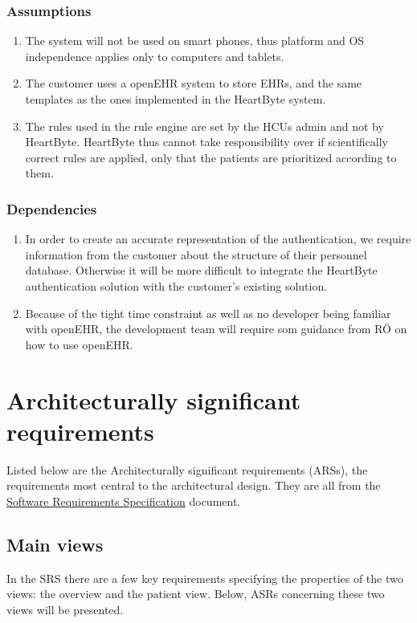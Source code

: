\documentclass{article}
\begin{document}
\subsubsection{Assumptions}
\begin{enumerate}[label=(\roman*)]
\item The system will not be used on smart phones, thus platform and OS independence applies only to computers and tablets. 
\item The customer uses a openEHR system to store EHRs, and the same templates as the ones implemented in the HeartByte system.
\item The rules used in the rule engine are set by the HCUs admin and not by HeartByte. HeartByte thus cannot take responsibility over if scientifically correct rules are applied, only that the patients are prioritized according to them.
\end{enumerate}
\subsubsection{Dependencies}
\begin{enumerate}[label=(\roman*)]
\item In order to create an accurate representation of the authentication, we require information from the customer about the structure of their personnel database. Otherwise it will be more difficult to integrate the HeartByte authentication solution with the customer's existing solution.
\item Because of the tight time constraint as well as no developer being familiar with openEHR, the development team will require som guidance from RÖ on how to use openEHR.

\end{enumerate}

\section{Architecturally significant requirements}
Listed below are the Architecturally significant requirements (ARSs), the requirements most central to the architectural design. They are all from the \href{https://gitlab.liu.se/tddc88-company-3-2020/deploy/-/tree/Document_branch/Software\%20Requirements\%20Specification}{\underline{Software Requirements Specification}} document.

\subsection{Main views}
In the SRS there are a few key requirements specifying the properties of the two views: the overview and the patient view. Below, ASRs concerning these two views will be presented.
\end{document}
